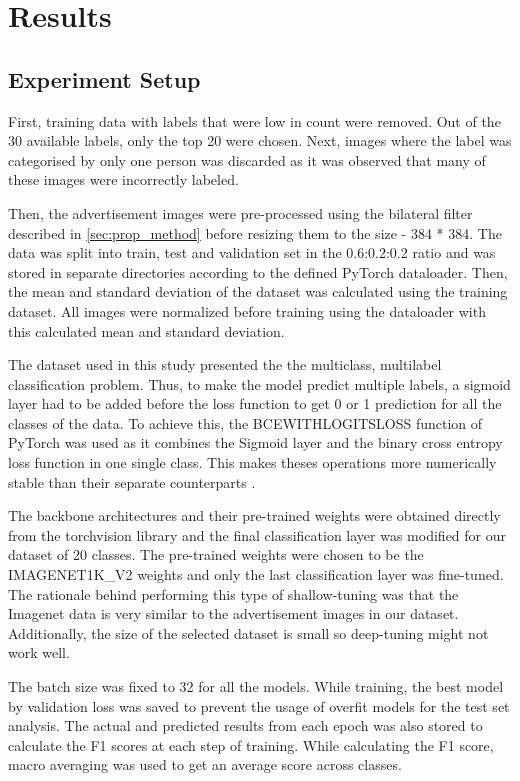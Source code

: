 \documentclass[conference]{IEEEtran}
\begin{document}
\section{Results} \label{sec:result}
\subsection{Experiment Setup}

First, training data with labels that were low in count were removed. Out of the 30 available
labels, only the top 20 were chosen. Next, images where the label was categorised by only one 
person was discarded as it was observed that many of these images were incorrectly labeled.

Then, the advertisement images were pre-processed using the bilateral filter described 
in \ref{sec:prop_method} before resizing them to the 
size - 384 * 384. The data was split into train, test and validation set in the 0.6:0.2:0.2 
ratio and was stored in separate directories according to the defined PyTorch dataloader. 
Then, the mean and standard deviation of the dataset was calculated using the training dataset. 
All images were normalized before training using the dataloader with this calculated mean and 
standard deviation. 

The dataset used in this study presented the the multiclass, 
multilabel classification problem.  Thus, to make the model predict multiple labels, a 
sigmoid layer had to be added before the loss function to get 0 or 1 prediction for 
all the classes of the data. To achieve this, the BCEWITHLOGITSLOSS function of PyTorch 
was used as it combines the Sigmoid layer and the  binary cross entropy loss function 
in one single class. This makes theses operations more numerically stable than their 
separate counterparts \cite{b23}.

The backbone architectures and their pre-trained weights were obtained directly from the 
torchvision library and the final classification layer was modified for our dataset of 
20 classes. The pre-trained weights were chosen to be the IMAGENET1K\_V2 weights and only 
the last classification layer was fine-tuned. The rationale behind performing this type of 
shallow-tuning was that the Imagenet data is very similar to the advertisement images in 
our dataset. Additionally, the size of the selected dataset is small so deep-tuning might not work well. 

The batch size was fixed to 32 for all the models. While training, the best model by 
validation loss was saved to prevent the usage of overfit models for the test set analysis. 
The actual and predicted results from each epoch was also stored to calculate the F1 scores at 
each step of training. While calculating the F1 score, macro averaging 
was used to get an average score across classes. 
\end{document}
